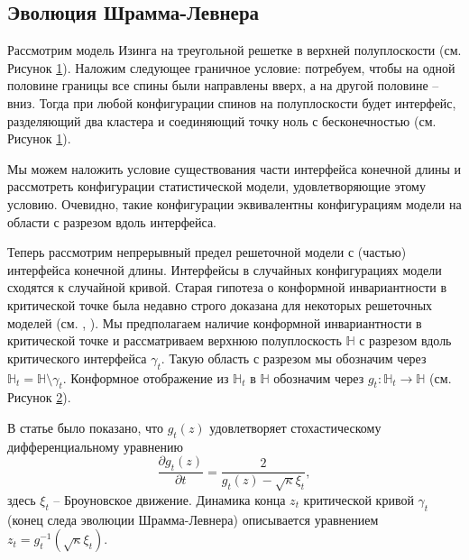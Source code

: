 \subsection{Эволюция Шрамма-Левнера}
\label{sec:schr-loewn-evol}
Рассмотрим модель Изинга на треугольной решетке в верхней полуплоскости (см. Рисунок \ref{fig:sle}). Наложим следующее граничное условие: потребуем, чтобы на одной половине границы все спины были направлены вверх, а на другой половине -- вниз. Тогда при любой конфигурации спинов на полуплоскости будет интерфейс, разделяющий два кластера и соединяющий точку ноль с бесконечностью (см. Рисунок \ref{fig:sle}).

\begin{figure}[h]
  \label{fig:sle}
\end{figure}
Мы можем наложить условие существования части интерфейса конечной длины и рассмотреть конфигурации статистической модели, удовлетворяющие этому условию. Очевидно, такие конфигурации эквивалентны конфигурациям модели на области с разрезом вдоль интерфейса. 

Теперь рассмотрим непрерывный предел решеточной модели с (частью) интерфейса конечной длины. Интерфейсы в случайных конфигурациях модели сходятся к случайной кривой. Старая гипотеза \cite{Polyakov:1970xd} о конформной инвариантности в критической точке была недавно строго доказана для некоторых решеточных моделей (см. \cite{smirnov2007towards}, \cite{duminil2011conformal}). Мы предполагаем наличие конформной инвариантности в критической точке и рассматриваем верхнюю полуплоскость  $\mathbb{H}$ с разрезом вдоль критического интерфейса  $\gamma_{t}$. Такую область с разрезом мы обозначим через  $\mathbb{H}_{t}=\mathbb{H}\setminus \gamma_{t}$. Конформное отображение из $\mathbb{H}_{t}$ в $\mathbb{H}$ обозначим через $g_{t}:\mathbb{H}_{t}\to \mathbb{H}$ (см. Рисунок \ref{fig:sle2}).

\begin{figure}[h]
  \label{fig:sle2}
\end{figure}

В статье \cite{schramm2000scaling} было показано, что  $g_{t}(z)$ удовлетворяет стохастическому дифференциальному уравнению
\begin{equation}
\label{eq:166}
  \frac{\partial g_t(z)}{\partial t} = \frac{ 2}{g_t(z)-\sqrt{\kappa}\xi_{t}} ,
\end{equation}
здесь $\xi_{t}$ -- Броуновское движение. Динамика конца  $z_{t}$ критической кривой $\gamma_{t}$ (конец следа эволюции Шрамма-Левнера) описывается уравнением $z_{t}=g_{t}^{-1}(\sqrt{\kappa}\xi_{t})$. 

